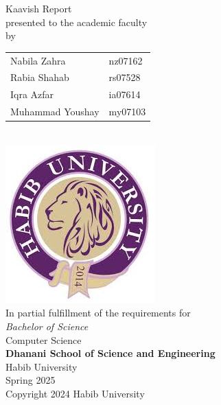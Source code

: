 \begin{titlepage}
  
  \begin{center}
    \vfill
    \textbf{\Huge \Title}
    \bigskip

    {\large Kaavish Report\\
      presented to the academic faculty\\
      by\\\bigskip
      \begin{tabular}{ll}
        Nabila Zahra & nz07162\\
        Rabia Shahab & rs07528\\
        Iqra Azfar & ia07614\\
        Muhammad Youshay & my07103\\
      \end{tabular}
    }\\\vfill
    \includegraphics[width=.4\textwidth]{images.jpg}\\
    {\large In partial fulfillment of the requirements for\\
      \textit{Bachelor of Science}\\
      Computer Science\\\medskip
      \textbf{Dhanani School of Science and Engineering}\\\medskip
      Habib University\\\smallskip
      Spring 2025
    }\\\vfill
    Copyright {\scriptsize \textcopyright} 2024 Habib University
  \end{center}
  \restoregeometry
\end{titlepage}

